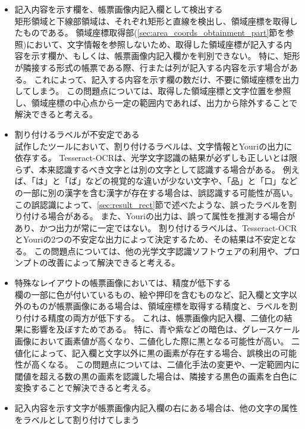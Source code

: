 \begin{itemize}
    \item 記入内容を示す欄を、帳票画像内記入欄として検出する\\
        矩形領域と下線部領域は、それぞれ矩形と直線を検出し、領域座標を取得したものである。
        領域座標取得部(\ref{sec:area_coords_obtainment_part}節を参照)において、文字情報を参照しないため、取得した領域座標が記入する内容を示す欄か、もしくは、帳票画像内記入欄かを判別できない。
        特に、矩形が隣接する形式の帳票である際、行または列が記入する内容を示す場合がある。
        これによって、記入する内容を示す欄の数だけ、不要に領域座標を出力してしまう。
        この問題点については、取得した領域座標と文字位置を参照し、領域座標の中心点から一定の範囲内であれば、出力から除外することで解決できると考える。
    \item 割り付けるラベルが不安定である\\
        試作したツールにおいて、割り付けるラベルは、文字情報とYouriの出力に依存する。
        Tesseract-OCRは、光学文字認識の結果が必ずしも正しいとは限らず、本来認識するべき文字とは別の文字として認識する場合がある。
        例えば、「は」と「ば」などの視覚的な違いが少ない文字や、「品」と「口」などの一部に別の漢字を含む漢字が存在する場合は、誤認識する可能性が高い。
        この誤認識によって、\ref{sec:result_rect}節で述べたような、誤ったラベルを割り付ける場合がある。
        また、Youriの出力は、誤って属性を推測する場合があり、かつ出力が常に一定ではない。
        割り付けるラベルは、Tesseract-OCRとYouriの2つの不安定な出力によって決定するため、その結果は不安定となる。
        この問題点については、他の光学文字認識ソフトウェアの利用や、プロンプトの改善によって解決できると考える。
    \item 特殊なレイアウトの帳票画像においては、精度が低下する\\
        欄の一部に色が付いているもの、絵や押印を含むものなど、記入欄と文字以外のものが帳票画像にある場合は、領域座標を取得する精度と、ラベルを割り付ける精度の両方が低下する。
        これは、帳票画像内記入欄、二値化の結果に影響を及ぼすためである。
        特に、青や紫などの暗色は、グレースケール画像において画素値が高くなり、二値化した際に黒となる可能性が高い。
        二値化によって、記入欄と文字以外に黒の画素が存在する場合、誤検出の可能性が高くなる。
        この問題点については、二値化手法の変更や、一定範囲内に閾値を超える数の黒の画素を認識した場合は、隣接する黒色の画素を白色に変換することで解決できると考える。
    \item 記入内容を示す文字が帳票画像内記入欄の右にある場合は、他の文字の属性をラベルとして割り付けてしまう\\

\end{itemize}
